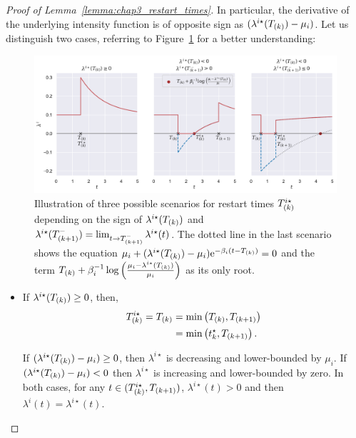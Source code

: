 \begin{subappendices}
\begin{proof}[Proof of Lemma~\ref{lemma:chap3_restart_times}]
        In particular, the derivative of the underlying intensity function is of opposite sign as $(\lambda^{i\star}(T\park) - \mu_i)$.
        Let us distinguish two cases,
        referring to Figure~\ref{fig:chap3_lemma} for a better understanding:
        
        {\begin{figure}[!ht]
        \centering
        \includegraphics[width=\linewidth]{images/chapter3/cooldownTimesMarkedMulti.pdf}
        \caption{Illustration of three possible scenarios for restart times $T\park^{i\star}$ depending on the sign of $\lambda^{i\star}(T\park)$ and $\lambda^{i\star}(T\park[k+1]^-) = \lim_{t\to T\park[k+1]^-}{\lambda^{i\star}(t)}$. The dotted line in the last scenario shows the equation $\mu_i + (\lambda^{i\star}(T\park) - \mu_i)\mathrm{e}^{-\beta_i(t-T\park)} = 0$ and the term $T\park + \beta_i^{-1}\log{\adaptedpar{\frac{\mu_i - \lambda^{i\star}(T\park)}{\mu_i}}}$ as its only root.}
        \label{fig:chap3_lemma}
        \end{figure}}
  
        \begin{itemize}
            \item If $\lambda^{i\star}(T\park) \geq 0$, then,
            \begin{align*}
              T^{i\star}\park = T\park &= \min{\adaptedpar{T\park, T\park[k+1]}} \\
              &= \min{\adaptedpar{t^\star_k, T\park[k+1]}}\,.
            \end{align*}
  
            If $(\lambda^{i\star}(T\park) - \mu_i) \geq 0$, then $\lambda^{i\star}$ is decreasing and lower-bounded by $\mu_i$. If $(\lambda^{i\star}(T\park) - \mu_i) < 0$ then $\lambda^{i\star}$ is increasing and lower-bounded by zero. In both cases, for any $t\in(T^{i\star}\park, T\park[k+1])$, $\lambda^{i\star}(t) > 0$ and then $\lambda^i(t) = \lambda^{i\star}(t)$.
  

\end{itemize}
\end{proof}
\end{subappendices}
